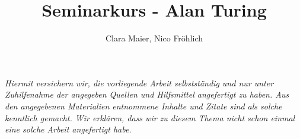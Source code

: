 \documentclass[11pt,a4paper]{article}
\author{Clara Maier, Nico Fröhlich}
\title{Seminarkurs - Alan Turing}
\begin{document}
\maketitle
\newpage
\emph{Hiermit versichern wir, die vorliegende Arbeit selbstständig und nur unter Zuhilfenahme der angegeben Quellen und Hilfsmittel angefertigt zu haben. Aus den angegebenen Materialien entnommene Inhalte und Zitate sind als solche kenntlich gemacht. Wir erklären, dass wir zu diesem Thema nicht schon einmal eine solche Arbeit angefertigt habe.}
\newpage

\tableofcontents
\newpage








\end{document}
